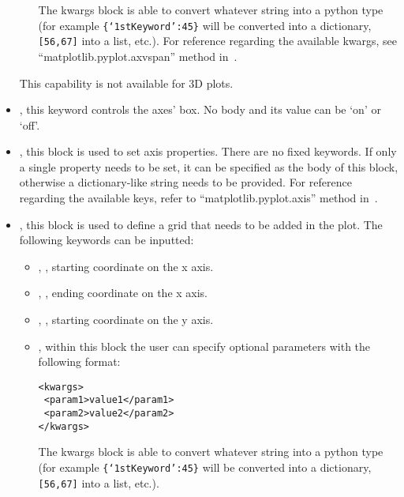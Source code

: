 \begin{itemize}
\begin{itemize}
    The kwargs block is able to convert whatever string into a python type (for
    example \texttt{\{`1stKeyword':45\}} will
    be converted into a dictionary, 
    \texttt{[56,67]} into a list, etc.).
    For reference regarding the available kwargs, see
    ``matplotlib.pyplot.axvspan'' method in~\cite{MatPlotLib}.
  \end{itemize}
  \nb This capability is not available for 3D plots.
  \item {}, this keyword controls the axes' box.
  No body and its value can be `on' or `off'.
  \item {}, this block is used to set axis properties.
  There are no fixed keywords.
  If only a single property needs to be set, it can be specified as the body of
  this block, otherwise a dictionary-like string needs to be provided.
  For reference regarding the available keys, refer to
  ``matplotlib.pyplot.axis'' method in~\cite{MatPlotLib}.
  \item {}, this block is used to define a grid that needs to be
  added in the plot.
  The following keywords can be inputted:
  \begin{itemize}
    \item {}, , starting coordinate on the x
    axis.
    \item {}, , ending coordinate on the
    x axis.
    \item {}, , starting coordinate on
    the y axis.
    \item {}, within this block the user can specify optional
    parameters with the following format:

\begin{lstlisting}[style=XML]
<kwargs>
 <param1>value1</param1>
 <param2>value2</param2>
</kwargs>
\end{lstlisting}

    The kwargs block is able to convert whatever string into a python type (for
    example \texttt{\{`1stKeyword':45\}} will
    be converted into a dictionary, 
    \texttt{[56,67]} into a list, etc.).
  \end{itemize}
  \vspace{-5mm}
\end{itemize}
